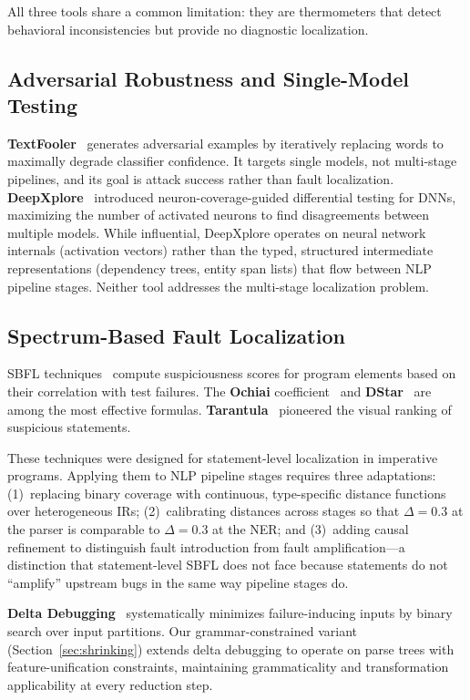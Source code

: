 \documentclass[sigconf,nonacm]{acmart}
\begin{document}
All three tools share a common limitation: they are thermometers that detect behavioral inconsistencies but provide no diagnostic localization.

\subsection{Adversarial Robustness and Single-Model Testing}

\textbf{TextFooler}~\cite{jin2020bert} generates adversarial examples by iteratively replacing words to maximally degrade classifier confidence.
It targets single models, not multi-stage pipelines, and its goal is attack success rather than fault localization.
\textbf{DeepXplore}~\cite{pei2017deepxplore} introduced neuron-coverage-guided differential testing for DNNs, maximizing the number of activated neurons to find disagreements between multiple models.
While influential, DeepXplore operates on neural network internals (activation vectors) rather than the typed, structured intermediate representations (dependency trees, entity span lists) that flow between NLP pipeline stages.
Neither tool addresses the multi-stage localization problem.

\subsection{Spectrum-Based Fault Localization}

SBFL techniques~\cite{wong2016survey} compute suspiciousness scores for program elements based on their correlation with test failures.
The \textbf{Ochiai} coefficient~\cite{abreu2007accuracy} and \textbf{DStar}~\cite{wong2014dstar} are among the most effective formulas.
\textbf{Tarantula}~\cite{jones2002visualization} pioneered the visual ranking of suspicious statements.

These techniques were designed for statement-level localization in imperative programs.
Applying them to NLP pipeline stages requires three adaptations: (1)~replacing binary coverage with continuous, type-specific distance functions over heterogeneous IRs; (2)~calibrating distances across stages so that $\Delta = 0.3$ at the parser is comparable to $\Delta = 0.3$ at the NER; and (3)~adding causal refinement to distinguish fault introduction from fault amplification---a distinction that statement-level SBFL does not face because statements do not ``amplify'' upstream bugs in the same way pipeline stages do.

\textbf{Delta Debugging}~\cite{zeller2002simplifying} systematically minimizes failure-inducing inputs by binary search over input partitions.
Our grammar-constrained variant (Section~\ref{sec:shrinking}) extends delta debugging to operate on parse trees with feature-unification constraints, maintaining grammaticality and transformation applicability at every reduction step.
\end{document}
